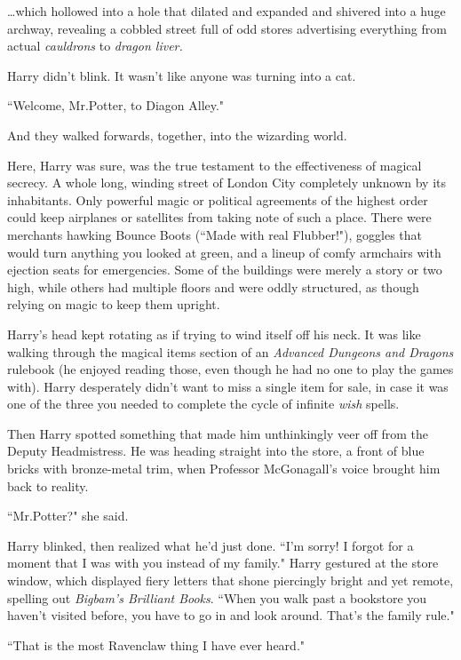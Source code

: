{\ldots}which hollowed into a hole that dilated and expanded and shivered into a huge archway, revealing a cobbled street full of odd stores advertising everything from actual \emph{cauldrons} to \emph{dragon liver.}

Harry didn't blink. It wasn't like anyone was turning into a cat.

``Welcome, Mr.\?Potter, to Diagon Alley."

And they walked forwards, together, into the wizarding world.

Here, Harry was sure, was the true testament to the effectiveness of magical secrecy. A whole long, winding street of London City completely unknown by its inhabitants. Only powerful magic or political agreements of the highest order could keep airplanes or satellites from taking note of such a place. There were merchants hawking
Bounce Boots (``Made with real Flubber!"), goggles that would turn anything you looked at green, and a lineup of comfy armchairs with ejection seats for emergencies. Some of the buildings were merely a story or two high, while others had multiple floors and were oddly structured, as though relying on magic to keep them upright.

Harry's head kept rotating as if trying to wind itself off his neck. It was like walking through the magical items section of an \emph{Advanced Dungeons and Dragons} rulebook (he enjoyed reading those, even though he had no one to play the games with). Harry desperately didn't want to miss a single item for sale, in case it was one of the three you needed to complete the cycle of infinite \emph{wish} spells.

Then Harry spotted something that made him unthinkingly veer off from the Deputy Headmistress. He was heading straight into the store, a front of blue bricks with bronze-metal trim, when Professor McGonagall's voice brought him back to reality.

``Mr.\?Potter?" she said.

Harry blinked, then realized what he'd just done. ``I'm sorry! I forgot for a moment that I was with you instead of my family." Harry gestured at the store window, which displayed fiery letters that shone piercingly bright and yet remote, spelling out \emph{Bigbam's Brilliant Books}. ``When you walk past a bookstore you haven't visited before, you have to go in and look around. That's the family rule."

``That is the most Ravenclaw thing I have ever heard."


